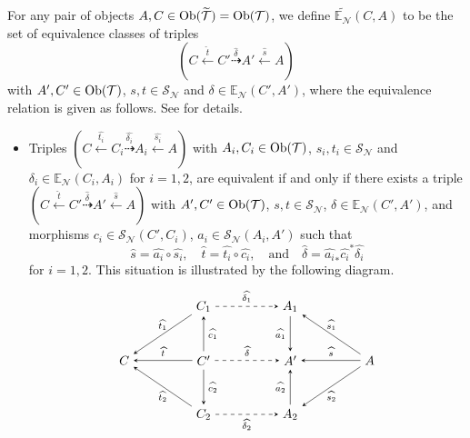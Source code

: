 \documentclass[a4paper,reqno,10pt]{amsart}
\theoremstyle{definition}
\theoremstyle{definition}
\theoremstyle{definition}
\theoremstyle{definition}
\theoremstyle{plain}
\newcommand{\BE}{\mathbb{E}}
\newcommand{\CN}{\mathcal{N}}
\newcommand{\CT}{\mathcal{T}}
\renewcommand{\SS}{\mathscr{S}}
\begin{document}
For any pair of objects $A,C\in\Ob(\widetilde{\CT})=\Ob(\CT)$, we define $\widetilde{\BE_{\CN}}(C,A)$ to be the set of equivalence classes of triples
\[ (C\xleftarrow{\widehat{t}}C'\overset{\widehat{\delta}}{\dashrightarrow}A'\xleftarrow{\widehat{s}}A) \]
with $A',C'\in\Ob(\CT)$, $s,t\in\SS_{\CN}$ and $\delta\in\BE_{\CN}(C',A')$, where the equivalence relation is given as follows. See \cite[Proposition~3.19]{NOS22} for details.
\begin{itemize}
\item Triples
$(C\xleftarrow{\widehat{t_i}}C_i\overset{\widehat{\delta_i}}{\dashrightarrow}A_i\xleftarrow{\widehat{s_i}}A)$
with $A_i,C_i\in\Ob(\CT)$, $s_i,t_i\in\SS_{\CN}$ and $\delta_i\in\BE_{\CN}(C_i,A_i)$ for $i=1,2$, are equivalent if and only if there exists a triple
$(C\xleftarrow{\widehat{t}}C'\overset{\widehat{\delta}}{\dashrightarrow}A'\xleftarrow{\widehat{s}}A)$
with $A',C'\in\Ob(\CT)$, $s,t\in\SS_{\CN}$, $\delta\in\BE_{\CN}(C',A')$, and morphisms $c_i\in\SS_{\CN}(C',C_i)$, $a_i\in\SS_{\CN}(A_i,A')$ such that 
\[
\widehat{s}=\widehat{a_i}\circ\widehat{s_i},\quad
\widehat{t}=\widehat{t_i}\circ\widehat{c_i},\quad \text{and}\quad 
\widehat{\delta}=\widehat{a_i}_{\ast}\widehat{c_i}^{\ast}\widehat{\delta_i}
\]
for $i=1,2$.
This situation is illustrated by the following diagram.
\[
\begin{tikzpicture}[>=stealth]
\node (1) at (-1.2,0) {$C'$};
\node (2) at (-1.2,1.5) {$C_1$};
\node (3) at (-1.2,-1.5) {$C_2$};
\node (4) at (-3.4,0) {$C$};
\node (5) at (3.4,0) {$A$};
\node (6) at (1.2,1.5) {$A_1$};
\node (7) at (1.2,-1.5) {$A_2$};
\node (8) at (1.2,0) {$A'$};
\draw[->] (1) -- node[right,font=\scriptsize] {$\widehat{c_1}$} (2);
\draw[->] (1) -- node[right,font=\scriptsize] {$\widehat{c_2}$} (3);
\draw[->] (1) -- node[above,font=\scriptsize] {$\widehat{t}$} (4);
\draw[->] (2) -- node[above,font=\scriptsize] {$\widehat{t_1}$} (4);
\draw[->] (3) -- node[below,font=\scriptsize] {$\widehat{t_2}$} (4);
\draw[->, dashed] (2) -- node[above,font=\scriptsize] {$\widehat{\delta_1}$} (6);
\draw[->, dashed] (3) -- node[below,font=\scriptsize] {$\widehat{\delta_2}$} (7);
\draw[->, dashed] (1) -- node[above,font=\scriptsize] {$\widehat{\delta}$} (8);
\draw[->] (5) -- node[above,font=\scriptsize] {$\widehat{s_1}$} (6);
\draw[->] (5) -- node[below,font=\scriptsize] {$\widehat{s_2}$} (7);
\draw[->] (5) -- node[above,font=\scriptsize] {$\widehat{s}$} (8);
\draw[->] (6) -- node[left,font=\scriptsize] {$\widehat{a_1}$} (8);
\draw[->] (7) -- node[left,font=\scriptsize] {$\widehat{a_2}$} (8);
\end{tikzpicture}
\]
\end{itemize}
\end{document}
